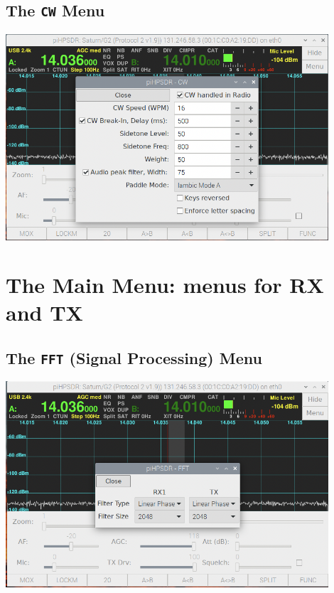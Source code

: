 \documentclass[12pt]{book}
\begin{document}
\section{The \texttt{CW} Menu}
\begin{center}
\includegraphics[width=12cm]{CWMenu.png}
\end{center}

\chapter{The Main Menu: menus for RX and TX}

\section{The \texttt{FFT} (Signal Processing) Menu}
\begin{center}
\includegraphics[width=12cm]{FFTMenu.png}
\end{center}
\end{document}
